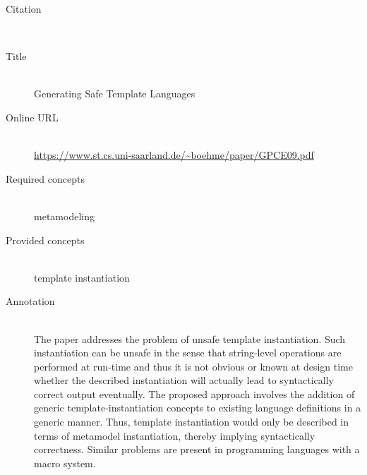 \begin{description}
\item[Citation]\mbox{}\\
\cite{HeidenreichJSWB09}
\item[Title]\mbox{}\\
Generating Safe Template Languages
\item[Online URL]\mbox{}\\
{\footnotesize\url{https://www.st.cs.uni-saarland.de/~boehme/paper/GPCE09.pdf}}
\item[Required concepts]\mbox{}\\
metamodeling\item[Provided concepts]\mbox{}\\
template instantiation\item[Annotation]\mbox{}\\
The paper addresses the problem of unsafe template instantiation. Such instantiation can be unsafe in the sense that string-level operations are performed at run-time and thus it is not obvious or known at design time whether the described instantiation will actually lead to syntactically correct output eventually. The proposed approach involves the addition of generic template-instantiation concepts to existing language definitions in a generic manner. Thus, template instantiation would only be described in terms of metamodel instantiation, thereby implying syntactically correctness. Similar problems are present in programming languages with a macro system.
\end{description}

